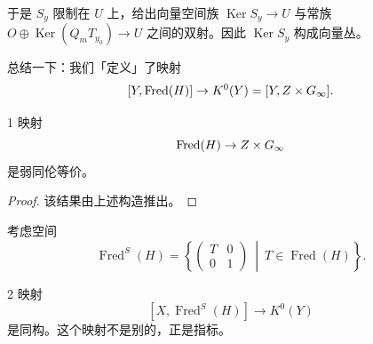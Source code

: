 于是 $S_y$ 限制在 $U$ 上，给出向量空间族 $\operatorname{Ker}S_y\to U$ 与常族 $O\oplus\operatorname{Ker}(Q_mT_{y_0})\to U$ 之间的双射。因此 $\operatorname{Ker}S_y$ 构成向量丛。

总结一下：我们「定义」了映射
\[ [Y,\operatorname{Fred}(H)]\to K^0(Y)=[Y,Z\times G_\infty]. \]

\begin{thm}{1}
映射
\[ \operatorname{Fred}(H)\to Z\times G_\infty \]
是弱同伦等价。
\end{thm}

\begin{proof}
该结果由上述构造推出。
\end{proof}


考虑空间
\[ \operatorname{Fred}^S(H)=\left\{\begin{pmatrix} T & 0 \\ 0 & 1\end{pmatrix}\ \middle|\ T\in\operatorname{Fred}(H)\right\}. \]

\begin{thm}{2}
映射
\[ [X,\operatorname{Fred}^S(H)]\to K^0(Y) \]
是同构。这个映射不是别的，正是指标。
\end{thm}


